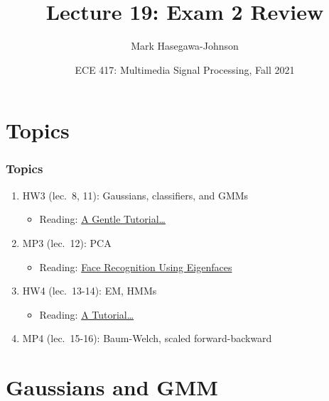 \documentclass{beamer}
\title{Lecture 19: Exam 2 Review}
\author{Mark Hasegawa-Johnson}
\date{ECE 417: Multimedia Signal Processing, Fall 2021}
\begin{document}
\begin{frame}
  \maketitle
\end{frame}

\begin{frame}
  \tableofcontents
\end{frame}


\section[Topics]{Topics}
\setcounter{subsection}{1}

\begin{frame}
  \frametitle{Topics}

  \begin{enumerate}
  \item HW3 (lec.~8, 11): Gaussians, classifiers, and GMMs
    \begin{itemize}
    \item Reading:
      \href{http://faculty.washington.edu/fxia/courses/LING572/EM_bilmes98.pdf}{\color{blue}A Gentle Tutorial\ldots}
    \end{itemize}
  \item MP3 (lec.~12): PCA
    \begin{itemize}
    \item Reading:
      \href{http://hans.fugal.net/comps/papers/turk_1991.pdf}{\color{blue}Face Recognition Using Eigenfaces}
    \end{itemize}
  \item HW4 (lec.~13-14): EM, HMMs
    \begin{itemize}
    \item Reading:
      \href{https://ieeexplore.ieee.org/document/18626?arnumber=18626}{\color{blue}A Tutorial\ldots}
    \end{itemize}
  \item MP4 (lec.~15-16): Baum-Welch, scaled forward-backward
  \end{enumerate}
\end{frame}

\section[Gaussians]{Gaussians and GMM}
\setcounter{subsection}{1}
\end{document}
